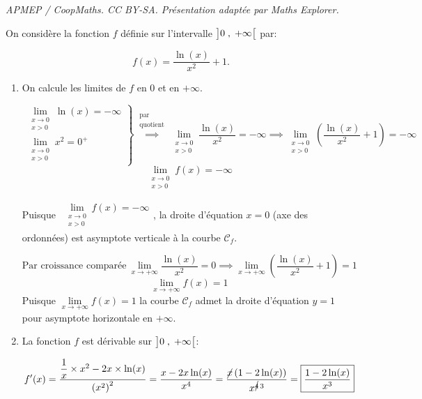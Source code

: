 \documentclass[10pt]{article}
\begin{document}
\noindent\textit{APMEP / CoopMaths. CC BY-SA. Présentation adaptée par Maths Explorer.}\par\medskip
\smallskip

On considère la fonction $f$ définie sur l'intervalle $\left ]0\;,\;+\infty\strut\right [$ par:

\[f(x)=\dfrac{\ln\left (x\right )}{x^2}+1.\]

\begin{enumerate}
	\item On calcule les limites de $f$ en 0 et en $+\infty$.

	\[\left.
	\begin{array}{l}
		\lim\limits_{\substack{x \to 0\\x > 0}}\ln(x) = -\infty\\[8pt]
		\lim\limits_{\substack{x \to 0\\x > 0}}x^{2} = 0^{+}
	\end{array}\right\} \overset{\substack{\text{par}\\\text{quotient}}}{\implies} \lim_{\substack{x \to 0\\x > 0}}\dfrac{\ln(x)}{x^{2}} = -\infty \implies \lim_{\substack{x \to 0\\x > 0}}\left(\dfrac{\ln(x)}{x^{2}} + 1\right) = -\infty\]
	\smallskip
	\[\boxed{\lim_{\substack{x \to 0\\x > 0}}f(x) = -\infty}\]
	\smallskip

	Puisque $\begin{gathered}\lim\limits_{\substack{x \to 0\\x > 0}}f(x) = -\infty\end{gathered}$, la droite d'équation $x = 0$ (axe des ordonnées) est asymptote verticale à la courbe $\mathcal{C}_{f}$.

\medskip

\[\text{Par croissance comparée}\ \lim_{x \to +\infty}\dfrac{\ln(x)}{x^{2}} = 0 \implies \lim_{x \to +\infty}\left(\dfrac{\ln(x)}{x^{2}} + 1\right) = 1\]
\[\boxed{\lim_{x \to +\infty}f(x) = 1}\]
Puisque $\lim\limits_{x \to +\infty}f(x) = 1$ la courbe $\mathcal{C}_{f}$ admet la droite d'équation $y = 1$ pour asymptote horizontale en $+\infty$.

	\item La fonction $f$ est dérivable sur  $\left ]0\;,\;+\infty\strut\right [$:

	\[f'(x) = \dfrac{\dfrac{1}{x}\times x^{2} - 2x \times \ln(x)}{\left(x^{2}\right)^{2}} = \dfrac{x - 2x\ln(x)}{x^{4}} = \dfrac{\cancel{x}\left(1-2\ln(x)\right)}{x^{\cancel{4}\, 3}} = \boxed{\dfrac{1-2\ln(x)}{x^{3}}}\]


\end{enumerate}
\end{document}
